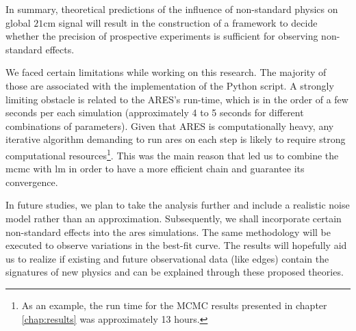 \documentclass[12pt, TexShade, letterpaper]{report}
\begin{document}
In summary, theoretical predictions of the influence of non-standard physics on global $\mathrm{21cm}$ signal will result in the construction of a framework to decide whether the precision of prospective experiments is sufficient for observing non-standard effects.\par

We faced certain limitations while working on this research. The majority of those are associated with the implementation of the Python script. 
A strongly limiting obstacle is related to the ARES's run-time, which is in the order of a few seconds per each simulation (approximately 4 to 5 seconds for different combinations of parameters). Given that ARES is computationally heavy, any iterative algorithm demanding to run \gls{ares} on each step is likely to require strong computational resources\footnote{ As an example, the run time for the MCMC results presented in chapter \ref{chap:results} was approximately 13 hours.}. This was the main reason that led us to combine the \gls{mcmc} with \gls{lm} in order to have a more efficient chain and guarantee its convergence.\par 

In future studies, we plan to take the analysis further and include a realistic noise model rather than an approximation. Subsequently, we shall incorporate certain non-standard effects into the \gls{ares} simulations. The same methodology will be executed to observe variations in the best-fit curve. 
The results will hopefully aid us to realize if existing and future observational data (like \gls{edges}) contain the signatures of new physics and can be explained through these proposed theories.\par


\label{chap:appendix,sub:code}
	{
	
	
	
	
	}
\end{document}
